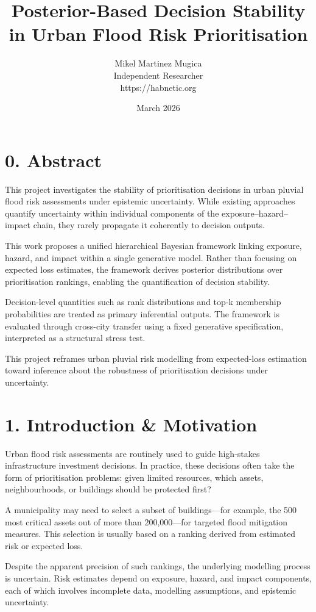 \documentclass[
]{article}
\title{Posterior-Based Decision Stability in Urban Flood Risk
Prioritisation}
\author{Mikel Martinez Mugica\\
Independent Researcher\\
https://habnetic.org}
\date{March 2026}
\begin{document}
\maketitle

\section{0. Abstract}\label{abstract}

This project investigates the stability of prioritisation decisions in
urban pluvial flood risk assessments under epistemic uncertainty. While
existing approaches quantify uncertainty within individual components of
the exposure--hazard--impact chain, they rarely propagate it coherently
to decision outputs.

This work proposes a unified hierarchical Bayesian framework linking
exposure, hazard, and impact within a single generative model. Rather
than focusing on expected loss estimates, the framework derives
posterior distributions over prioritisation rankings, enabling the
quantification of decision stability.

Decision-level quantities such as rank distributions and top-k
membership probabilities are treated as primary inferential outputs. The
framework is evaluated through cross-city transfer using a fixed
generative specification, interpreted as a structural stress test.

This project reframes urban pluvial risk modelling from expected-loss
estimation toward inference about the robustness of prioritisation
decisions under uncertainty.

\section{1. Introduction \& Motivation}\label{introduction-motivation}

Urban flood risk assessments are routinely used to guide high-stakes
infrastructure investment decisions. In practice, these decisions often
take the form of prioritisation problems: given limited resources, which
assets, neighbourhoods, or buildings should be protected first?

A municipality may need to select a subset of buildings---for example,
the 500 most critical assets out of more than 200,000---for targeted
flood mitigation measures. This selection is usually based on a ranking
derived from estimated risk or expected loss.

Despite the apparent precision of such rankings, the underlying
modelling process is uncertain. Risk estimates depend on exposure,
hazard, and impact components, each of which involves incomplete data,
modelling assumptions, and epistemic uncertainty.
\end{document}
